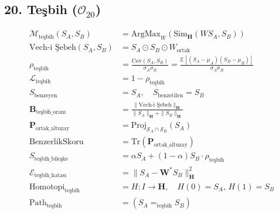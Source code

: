 \documentclass[11pt, a4paper]{article}
\begin{document}
\subsection{20. Teşbih ($\mathcal{O}_{20}$)}
\begin{align}
\mathcal{M}_{\text{teşbih}}(S_A, S_B) &= \text{ArgMax}_{W} \left( \text{Sim}_{\mathbf{H}}(W S_A, S_B) \right) \\
\text{Vech-i Şebeh}(S_A, S_B) &= S_A \odot S_B \odot W_{\text{ortak}} \\
\rho_{\text{teşbih}} &= \frac{\text{Cov}(S_A, S_B)}{\sigma_A \sigma_B} = \frac{\mathbb{E}[(S_A - \mu_A)(S_B - \mu_B)]}{\sigma_A \sigma_B} \\
\mathcal{L}_{\text{teşbih}} &= 1 - \rho_{\text{teşbih}} \\
S_{\text{benzeyen}} &= S_A, \quad S_{\text{benzetilen}} = S_B \\
\mathbf{B}_{\text{teşbih\_oranı}} &= \frac{\| \text{Vech-i Şebeh} \|_{\mathbf{H}}}{\|S_A\|_{\mathbf{H}} + \|S_B\|_{\mathbf{H}}} \\
\mathbf{P}_{\text{ortak\_altuzay}} &= \text{Proj}_{\mathcal{S}_A \cap \mathcal{S}_B}(S_A) \\
\text{BenzerlikSkoru} &= \text{Tr}(\mathbf{P}_{\text{ortak\_altuzay}}) \\
S_{\text{teşbih\_bileşke}} &= \alpha S_A + (1-\alpha) S_B \cdot \rho_{\text{teşbih}} \\
\mathcal{E}_{\text{teşbih\_hatası}} &= \| S_A - \mathbf{W}^* S_B \|_{\mathbf{H}}^2 \\
\text{Homotopi}_{\text{teşbih}} &= H : I \to \mathbf{H}, \quad H(0)=S_A, \, H(1)=S_B \\
\text{Path}_{\text{teşbih}} &= (S_A =_{\text{teşbih}} S_B)
\end{align}
\end{document}
